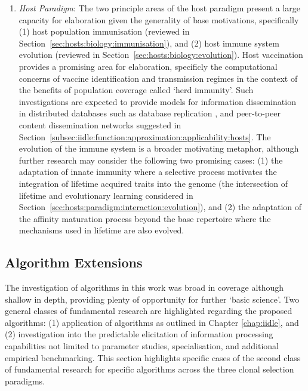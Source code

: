 \begin{enumerate}
	\item \emph{Host Paradigm}: The two principle areas of the host paradigm present a large capacity for elaboration given the generality of base motivations, specifically (1) host population immunisation (reviewed in Section~\ref{sec:hosts:biology:immunisation}), and (2) host immune system evolution (reviewed in Section~\ref{sec:hosts:biology:evolution}). Host vaccination provides a promising area for elaboration, specificly the computational concerns of vaccine identification and transmission regimes in the context of the benefits of population coverage called `herd immunity'. Such investigations are expected to provide models for information dissemination in distributed databases such as database replication \cite{Demers1987}, and peer-to-peer content dissemination networks \cite{Voulgaris2005} suggested in Section~\ref{subsec:iidle:function:approximation:applicability:hosts}. The evolution of the immune system is a broader motivating metaphor, although further research may consider the following two promising cases: (1) the adaptation of innate immunity where a selective process motivates the integration of lifetime acquired traits into the genome (the intersection of lifetime and evolutionary learning considered in Section~\ref{sec:hosts:paradigm:interaction:evolution}), and (2) the adaptation of the affinity maturation process beyond the base repertoire where the mechanisms used in lifetime are also evolved.
\end{enumerate}


%
%
\subsection{Algorithm Extensions}
The investigation of algorithms in this work was broad in coverage although shallow in depth, providing plenty of opportunity for further `basic science'. Two general classes of fundamental research are highlighted regarding the proposed algorithms: (1) application of algorithms as outlined in Chapter \ref{chap:iidle}, and (2) investigation into the predictable elicitation of information processing capabilities not limited to parameter studies, specialisation, and additional empirical benchmarking. This section highlights specific cases of the second class of fundamental research for specific algorithms across the three clonal selection paradigms.

